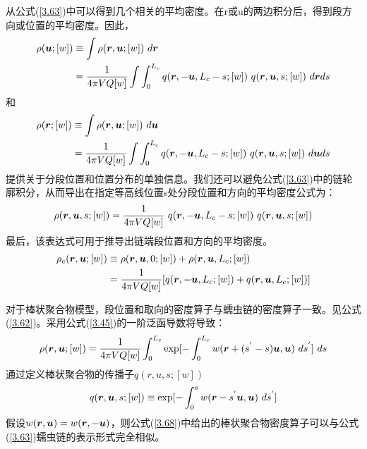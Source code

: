 从公式(\ref{3.63})中可以得到几个相关的平均密度。在r或u的两边积分后，得到段方向或位置的平均密度。因此，
\begin{equation}\label{3.64}
\begin{aligned}
\rho(\bm{u};[w])&\equiv\int \rho(\bm{r},\bm{u};[w])~d\bm{r} \\&=\frac{1}{4\pi VQ[w]}\int  \int_{0}^{L_c}q(\bm{r},-\bm{u},L_c-s;[w])~q(\bm{r},\bm{u},s;[w])~d\bm{r} ds
\end{aligned}
\end{equation}
和
\begin{equation}\label{3.65}
\begin{aligned}
\rho(\bm{r};[w])&\equiv\int \rho(\bm{r},\bm{u};[w])~d\bm{u} \\&=\frac{1}{4\pi VQ[w]}\int  \int_{0}^{L_c}q(\bm{r},-\bm{u},L_c-s;[w])~q(\bm{r},\bm{u},s;[w])~d\bm{u} ds
\end{aligned}
\end{equation}
提供关于分段位置和位置分布的单独信息。我们还可以避免公式(\ref{3.63})中的链轮廓积分，从而导出在指定等高线位置s处分段位置和方向的平均密度公式为：
\begin{equation}\label{3.66}
\rho(\bm{r},\bm{u},s;[w])=\frac{1}{4\pi VQ[w]}~q(\bm{r},-\bm{u},L_c-s;[w])~q(\bm{r},\bm{u},s;[w])
\end{equation}
最后，该表达式可用于推导出链端段位置和方向的平均密度。
\begin{equation}\label{3.67}
\begin{aligned}
\rho_e(\bm{r},\bm{u};[w])&\equiv \rho(\bm{r},\bm{u},0;[w])+\rho(\bm{r},\bm{u},L_c;[w])\\ &=\frac{1}{4\pi VQ[w]}[q(\bm{r},-\bm{u},L_c;[w])+q(\bm{r},\bm{u},L_c;[w])]
\end{aligned}
\end{equation}


对于棒状聚合物模型，段位置和取向的密度算子与蠕虫链的密度算子一致。见公式(\ref{3.62})。采用公式(\ref{3.45})的一阶泛函导数将导致：
\begin{equation}\label{3.68}
\rho(\bm{r},\bm{u};[w])=\frac{1}{4\pi VQ[w]}\int_{0}^{L_c}\exp[-\int_{0}^{L_c}w (\bm{r}+(s^{'}-s)\bm{u},\bm{u})~ds^{'}]~ds
\end{equation}
通过定义棒状聚合物的传播子$q(r,u,s;[w])$
\begin{equation}\label{3.69}
q(\bm{r},\bm{u},s;[w])\equiv \exp[-\int_{0}^{s}w(\bm{r}-s^{'}\bm{u},\bm{u})~ds^{'}]
\end{equation}
假设$w(\bm{r},\bm{u})=w(\bm{r},-\bm{u})$，则公式(\ref{3.68})中给出的棒状聚合物密度算子可以与公式(\ref{3.63})蠕虫链的表示形式完全相似。

